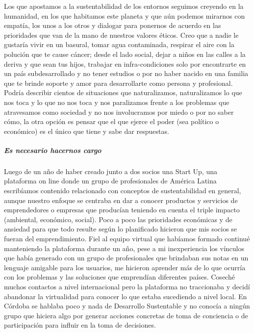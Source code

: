 \documentclass[
]{article}
\begin{document}
Los que apostamos a la sustentabilidad de los entornos seguimos creyendo
en la humanidad, en los que habitamos este planeta y que aún podemos
mirarnos con empatía, los unos a los otros y dialogar para ponernos de
acuerdo en las prioridades que van de la mano de nuestros valores
éticos. Creo que a nadie le gustaría vivir en un basural, tomar agua
contaminada, respirar el aire con la polución que te cause cáncer; desde
el lado social, dejar a niños en las calles a la deriva y que sean tus
hijos, trabajar en infra-condiciones solo por encontrarte en un país
subdesarrollado y no tener estudios o por no haber nacido en una familia
que te brinde soporte y amor para desarrollarte como persona y
profesional. Podría describir cientos de situaciones que naturalizamos,
naturalizamos lo que nos toca y lo que no nos toca y nos paralizamos
frente a los problemas que atravesamos como sociedad y no nos
involucramos por miedo o por no saber cómo, la otra opción es pensar que
el que ejerce el poder (sea político o económico) es el único que tiene
y sabe dar respuestas.

\hypertarget{es-necesario-hacernos-cargo}{%
\subparagraph{Es necesario hacernos
cargo}\label{es-necesario-hacernos-cargo}}

Luego de un año de haber creado junto a dos socios una Start Up, una
plataforma on line donde un grupo de profesionales de América Latina
escribíamos contenido relacionado con conceptos de sustentabilidad en
general, aunque nuestro enfoque se centraba en dar a conocer productos y
servicios de emprendedores o empresas que producían teniendo en cuenta
el triple impacto (ambiental, económico, social). Poco a poco las
prioridades económicas y de ansiedad para que todo resulte según lo
planificado hicieron que mis socios se fueran del emprendimiento. Fiel
al equipo virtual que habíamos formado continué manteniendo la
plataforma durante un año, pese a mi inexperiencia los vínculos que
había generado con un grupo de profesionales que brindaban sus notas en
un lenguaje amigable para los usuarios, me hicieron aprender más de lo
que ocurría con los problemas y las soluciones que emprendían diferentes
países. Coseché muchos contactos a nivel internacional pero la
plataforma no traccionaba y decidí abandonar la virtualidad para conocer
lo que estaba sucediendo a nivel local. En Córdoba se hablaba poco y
nada de Desarrollo Sustentable y no conocía a ningún grupo que hiciera
algo por generar acciones concretas de toma de conciencia o de
participación para influir en la toma de decisiones.
\end{document}
